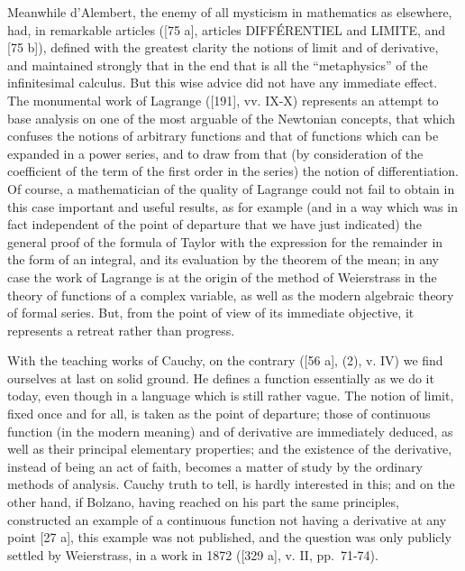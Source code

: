 Meanwhile d'Alembert, the enemy of all mysticism in mathematics as elsewhere, had, in remarkable articles ({[}75 a{]}, articles DIFFÉRENTIEL and LIMITE, and {[}75 b{]}), defined with the greatest clarity the notions of limit and of derivative, and maintained strongly that in the end that is all the ``metaphysics'' of the infinitesimal calculus. But this wise advice did not have any immediate effect. The monumental work of Lagrange ({[}191{]}, vv. IX-X) represents an attempt to base analysis on one of the most arguable of the Newtonian concepts, that which confuses the notions of arbitrary functions and that of functions which can be expanded in a power series, and to draw from that (by consideration of the coefficient of the term of the first order in the series) the notion of differentiation. Of course, a mathematician of the quality of Lagrange could not fail to obtain in this case important and useful results, as for example (and in a way which was in fact independent of the point of departure that we have just indicated) the general proof of the formula of Taylor with the expression for the remainder in the form of an integral, and its evaluation by the theorem of the mean; in any case the work of Lagrange is at the origin of the method of Weierstrass in the theory of functions of a complex variable, as well as the modern algebraic theory of formal series. But, from the point of view of its immediate objective, it represents a retreat rather than progress.

With the teaching works of Cauchy, on the contrary ({[}56 a{]}, (2), v. IV) we find ourselves at last on solid ground. He defines a function essentially as we do it today, even though in a language which is still rather vague. The notion of limit, fixed once and for all, is taken as the point of departure; those of continuous function (in the modern meaning) and of derivative are immediately deduced, as well as their principal elementary properties; and the existence of the derivative, instead of being an act of faith, becomes a matter of study by the ordinary methods of analysis. Cauchy truth to tell, is hardly interested in this; and on the other hand, if Bolzano, having reached on his part the same principles, constructed an example of a continuous function not having a derivative at any point {[}27 a{]}, this example was not published, and the question was only publicly settled by Weierstrass, in a work in 1872 ({[}329 a{]}, v. II, pp.~71-74).

